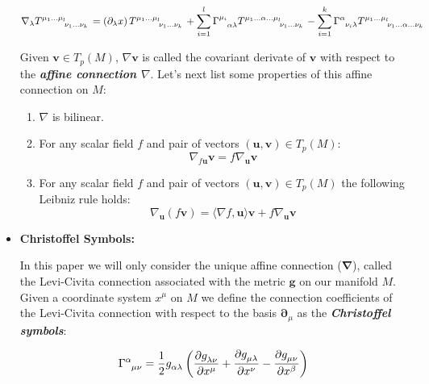 \documentclass[12pt]{article}
\renewcommand{\vec}[1]{\bm{#1}}
\numberwithin{equation}{section}
\numberwithin{theorem}{subsection}
\begin{document}
\begin{itemize}
\begin{align*}

    \nabla_{\lambda}\tensor{T}{^{\mu_{1}}^\dots^{\mu_{l}}_{\nu_{1}}_\dots_{\nu_{k}}} = (\partial_{\lambda}x)\, \tensor{T}{^{\mu_1}^\dots^{\mu_l}_{\nu_1}_\dots_{\nu_k}}+ \sum_{i=1}^{l}\tensor{\Gamma}{^{\mu_i}_\alpha_\lambda} \tensor{T}{^{\mu_{1}}^\dots^{\alpha}^\dots^{\mu_l}_{\nu_1}_\dots_{\nu_k}} - \sum_{i=1}^{k}\tensor{\Gamma}{^\alpha_{\nu_{i}}_\lambda}\tensor{T}{^{\mu_{1}}^\dots^{\mu_{l}}_{\nu_{1}}_\dots_\alpha_\dots_{\nu_{k}}} 

   \end{align*}

    Given $\vec{v} \in T_{p}(M)$, $\nabla{\vec{v}}$ is called the covariant derivate of $\vec{v}$ with respect to the \textit{\textbf{affine connection $\nabla$}}. Let's next list some properties of this affine connection on $M$:

    \begin{enumerate}

        \item $\nabla$ is bilinear.

        \item For any scalar field $f$ and pair of vectors $(\vec{u},\vec{v}) \in T_{p}(M)$: $$\nabla_{f \vec{u}}\vec{v} = f \nabla_{\vec{u}}\vec{v}$$

        \item  For any scalar field $f$ and pair of vectors $(\vec{u},\vec{v}) \in T_{p}(M)$ the following Leibniz rule holds: $$\nabla_{\vec{u}}(f\vec{v}) = \langle \nabla f , \vec{u} \rangle \vec{v} + f \nabla_{\vec{u}}\vec{v}$$ 

    \end{enumerate}

\item \textbf{Christoffel Symbols:}

In this paper we will only consider the unique affine connection ($\vec{\nabla}$), called the Levi-Civita connection associated with the metric $\vec{g}$ on our manifold $M$. Given a coordinate system $x^{\mu}$ on $M$ we define the connection coefficients of the Levi-Civita connection with respect to the basis $\vec{\partial}_{\mu}$ as the \textbf{\textit{Christoffel symbols}}:

$$\tensor{\Gamma}{^\alpha_\mu_\nu} = \frac{1}{2} \tensor{g}{_\alpha_\lambda} \left( \frac{\partial \tensor{g}{_\lambda_\nu}}{\partial \tensor{x}{^\mu}} + \frac{\partial \tensor{g}{_\mu_\lambda}}{\partial x^{\nu}} - \frac{\partial \tensor{g}{_\mu_\nu}}{\partial x^{\beta}}  \right)$$


\end{itemize}
\end{document}
